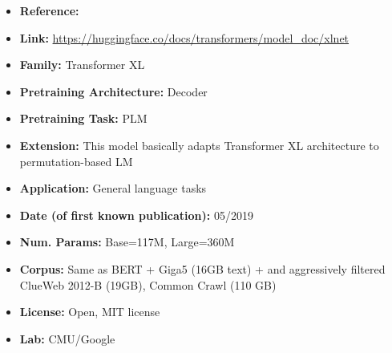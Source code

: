 \documentclass{article}
\begin{document}
            \begin{itemize}
                \item \textbf{Reference:} 
                \item \textbf{Link:} \url{https://huggingface.co/docs/transformers/model_doc/xlnet}
                \item \textbf{Family:} Transformer XL
                \item \textbf{Pretraining Architecture:} Decoder
                \item \textbf{Pretraining Task:} PLM
                \item \textbf{Extension:} This model basically adapts Transformer XL architecture to permutation-based LM
                \item \textbf{Application:} General language tasks
                \item \textbf{Date (of first known publication):} 05/2019
                \item \textbf{Num. Params:} Base=117M, Large=360M
                \item \textbf{Corpus:} Same as BERT + Giga5 (16GB text) + and aggressively filtered ClueWeb 2012-B (19GB), Common Crawl (110 GB)
                \item \textbf{License:} Open, MIT license
                \item \textbf{Lab:} CMU/Google
            \end{itemize}


 
 
\end{document}
